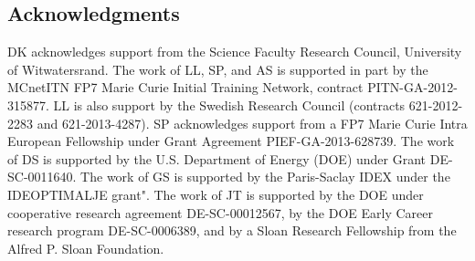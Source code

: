 \documentclass[11pt]{cernrep}
\begin{document}
\subsection*{Acknowledgments}

DK acknowledges support from the Science Faculty Research Council, University of Witwatersrand.
%
The work of LL, SP, and AS is supported in part by the MCnetITN FP7 Marie Curie Initial Training Network, contract PITN-GA-2012-315877.
%
LL is also support by the Swedish Research Council (contracts 621-2012-2283 and 621-2013-4287).
%
SP acknowledges support from a FP7 Marie Curie Intra European Fellowship under Grant Agreement PIEF-GA-2013-628739.
%
The work of DS is supported by the U.S. Department of Energy (DOE) under Grant DE-SC-0011640.
%
The work of GS is supported by the Paris-Saclay IDEX under the IDEOPTIMALJE grant". 
%
The work of JT is supported by the DOE under cooperative research agreement DE-SC-00012567, by the DOE Early Career research program DE-SC-0006389, and by a Sloan Research Fellowship from the Alfred P. Sloan Foundation.


\end{document}
